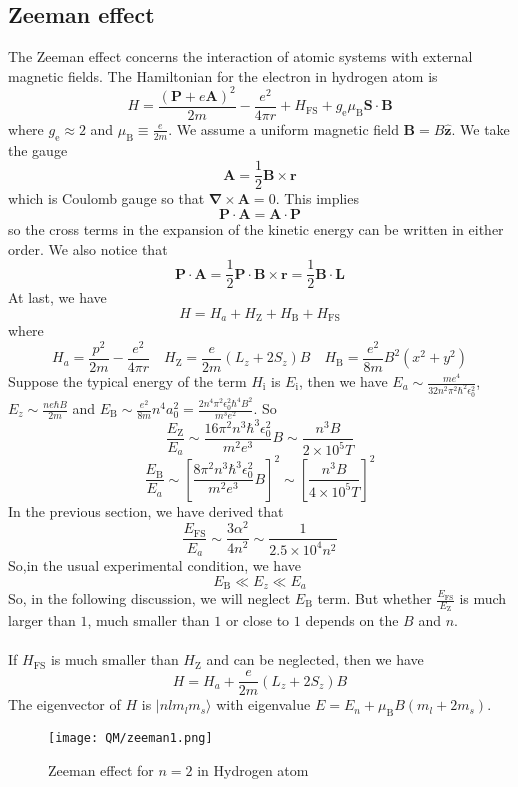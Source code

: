 \documentclass[cyan]{elegantnote}
\begin{document}
\subsection{Zeeman effect}
The Zeeman effect concerns the interaction of atomic systems with external magnetic fields. The Hamiltonian for the electron in hydrogen atom is
\[H = \frac{(\bm{P}+e\bm{A})^2}{2m} - \frac{e^2}{4\pi r} + H_{\mathrm{FS}} + g_{\mathrm{e}} \mu_{\mathrm{B}}\bm{S}\cdot\bm{B}\]
where $g_{\mathrm{e}} \approx 2$ and $\mu_{\mathrm{B}} \equiv \frac{e}{2m}$.
We assume a uniform magnetic field $\bm{B} = B\hat{\bm{z}}$. We take the gauge
\[\bm{A} = \frac{1}{2}\bm{B}\times\bm{r}\]
which is Coulomb gauge so that $\bm{\nabla}\times\bm{A} = 0$. This implies
\[\bm{P}\cdot\bm{A} = \bm{A}\cdot\bm{P}\]
so the cross terms in the expansion of the kinetic energy can be written in either order. We also notice that
\[\bm{P}\cdot\bm{A} = \frac{1}{2} \bm{P}\cdot\bm{B}\times\bm{r}  = \frac{1}{2}\bm{B}\cdot\bm{L}\] 
At last, we have
\[H = H_a + H_{\mathrm{Z}} + H_{\mathrm{B}} + H_{\mathrm{FS}}\]
where
\[H_a = \frac{p^2}{2m} - \frac{e^2}{4\pi r} \quad  H_{\mathrm{Z}} = \frac{e}{2m}(L_z + 2S_z)B \quad H_{\mathrm{B}} = \frac{e^2}{8m}B^2(x^2+y^2)\]
Suppose the typical energy of the term $H_{\mathrm{i}}$ is $E_{\mathrm{i}}$, then we have $E_a \sim \frac{me^4}{32 n^2 \pi^2\hbar^2\epsilon_0^2}$, $E_z \sim \frac{ne\hbar B}{2m}$ and $E_{\mathrm{B}} \sim \frac{e^2}{8m}n^4 a_0^2 = \frac{2n^4\pi^2 \epsilon_0^2 \hbar^4 B^2}{m^3 e^2}$. So
\[\frac{E_{\mathrm{Z}}}{E_a} \sim \frac{16\pi^2 n^3 \hbar^3 \epsilon_0^2}{m^2 e^3} B \sim \frac{n^3B}{2\times10^5 T}\]
\[\frac{E_{\mathrm{B}}}{E_a} \sim \left[ \frac{8\pi^2 n^3 \hbar^3 \epsilon_0^2}{m^2 e^3} B\right]^2 \sim \left[ \frac{n^3B}{4\times10^5 T} \right]^2\]
In the previous section, we have derived that
\[\frac{E_{\mathrm{FS}}}{E_a} \sim \frac{3\alpha^2}{4n^2} \sim \frac{1}{2.5\times10^4 n^2}\]
So,in the usual experimental condition, we have
\[E_{\mathrm{B}} \ll E_z \ll E_a\]
So, in the following discussion, we will neglect $E_{\mathrm{B}}$ term.
But whether $\frac{E_{\mathrm{FS}}}{E_{\mathrm{Z}}}$ is much larger than $1$, much smaller than $1$ or close to $1$ depends on the $B$ and $n$.\\ \\
If $H_{\mathrm{FS}}$ is much smaller than $H_{\mathrm{Z}}$ and can be neglected, then we have
\[H = H_a + \frac{e}{2m}(L_z + 2S_z)B\]
The eigenvector of $H$ is $|nlm_lm_s\rangle$ with eigenvalue $E = E_n + \mu_{\mathrm{B}} B(m_l+2m_s)$.
\begin{figure}[!h]
	\centering
	\texttt{[image: QM/zeeman1.png]}
	\caption{Zeeman effect for $n=2$ in Hydrogen atom}
\end{figure}\\
\end{document}
